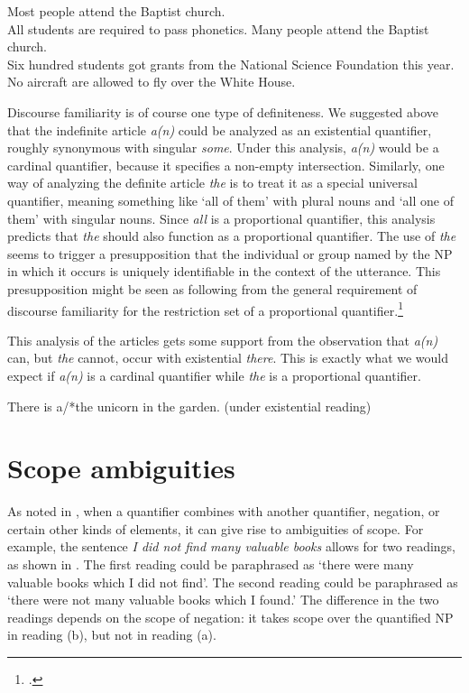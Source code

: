 {\ea \label{ex:14.28}
\ea Most people attend the Baptist church.\\
\ex All students are required to pass phonetics.
\z
\ex \label{ex:14.29}
\ea Many people attend the Baptist church.\\
\ex Six hundred students got grants from the National Science Foundation this year.\\
\ex No aircraft are allowed to fly over the White House.
                       \z
\z


Discourse familiarity is of course one type of definiteness. We suggested above that the indefinite article \textit{a(n)} could be analyzed as an existential quantifier, roughly synonymous with singular \textit{some}. Under this analysis, \textit{a(n)} would be a cardinal quantifier, because it specifies a non-empty intersection. Similarly, one way of analyzing the definite article \textit{the} is to treat it as a special universal quantifier, meaning something like ‘all of them’ with plural nouns and ‘all one of them’ with singular nouns. Since \textit{all} is a proportional quantifier, this analysis predicts that \textit{the} should also function as a proportional quantifier. The use of \textit{the} seems to trigger a presupposition that the individual or group named by the NP in which it occurs is uniquely identifiable in the context of the utterance. This presupposition might be seen as following from the general requirement of discourse familiarity for the restriction set of a proportional quantifier.\footnote{\citet{Kearns2000}.}



This analysis of the articles gets some support from the observation that \textit{a(n)} can, but \textit{the} cannot, occur with existential \textit{there}. This is exactly what we would expect if \textit{a(n)} is a cardinal quantifier while \textit{the} is a proportional quantifier.


\ea \label{ex:14.30}
  There is a/*the unicorn in the garden.  (under existential reading)
\z

\section{Scope ambiguities}\label{sec:14.5}

As noted in , when a quantifier combines with another quantifier, negation, or certain other kinds of elements, it can give rise to ambiguities of scope. For example, the sentence \textit{I did not find many valuable books} allows for two readings, as shown in . The first reading could be paraphrased as ‘there were many valuable books which I did not find’. The second reading could be paraphrased as ‘there were not many valuable books which I found.’ The difference in the two readings depends on the scope of negation: it takes scope over the quantified NP in reading (b), but not in reading (a).


}
